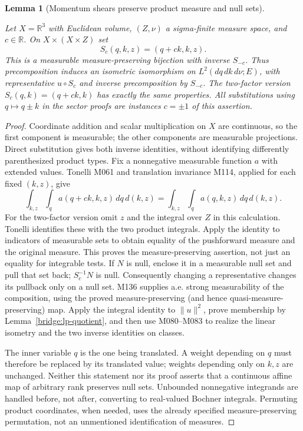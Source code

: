 \documentclass[11pt,a4paper]{article}
\newtheorem{lemma}[theorem]{Lemma}
\theoremstyle{definition}
\theoremstyle{remark}
\newcommand{\proofid}[1]{\par\smallskip{\normalfont\scriptsize\color{inkblue}Stable ID: \nolinkurl{#1}}\par\smallskip}
\begin{document}
\begin{lemma}[Momentum shears preserve product measure and null sets]
\label{bridge:shear}
\proofid{bridge:shear}
\par{}\par\smallskip
Let $X=\mathbb R^3$ with Euclidean volume, $(Z,\nu)$ a sigma-finite
measure space, and $c\in\mathbb R$. On $X\times(X\times Z)$ set
\[
 S_c(q,k,z)=(q+ck,k,z).
\]
This is a measurable measure-preserving bijection with inverse $S_{-c}$.
Thus precomposition induces an isometric isomorphism on
$L^2(dq\,dk\,d\nu;E)$, with representative $u\circ S_c$ and inverse
precomposition by $S_{-c}$. The two-factor version $S_c(q,k)=(q+ck,k)$ has exactly the same
properties. All substitutions using $q\mapsto q\pm k$
in the sector proofs are instances $c=\pm1$ of this assertion.
\end{lemma}
\begin{proof}
Coordinate addition and scalar multiplication on $X$ are continuous,
so the first component is measurable; the other components are
measurable projections. Direct substitution gives both inverse
identities, without identifying differently parenthesized product types.
Fix a nonnegative measurable function $a$ with extended values.
Tonelli M061 and translation invariance M114, applied for each fixed
$(k,z)$, give
\[
 \int_{k,z}\int_q a(q+ck,k,z)\,dq\,d(k,z)
 =\int_{k,z}\int_q a(q,k,z)\,dq\,d(k,z).
\]
For the two-factor version omit $z$ and the integral over $Z$ in
this calculation. Tonelli identifies these with the two product integrals. Apply the
identity to indicators of measurable sets to obtain equality of the
pushforward measure and the original measure. This proves the
measure-preserving assertion, not just an equality for integrable tests.
If $N$ is null, enclose it in a measurable null set and pull that set
back; $S_c^{-1}N$ is null. Consequently changing a representative
changes its pullback only on a null set. M136 supplies a.e. strong
measurability of the composition, using the proved measure-preserving
(and hence quasi-measure-preserving) map. Apply the integral identity
to $\|u\|^2$, prove membership by
Lemma~\ref{bridge:lp-quotient}, and then use M080--M083 to realize the
linear isometry and the two inverse identities on classes.

The inner variable $q$ is the one being translated. A weight depending
on $q$ must therefore be replaced by its translated value; weights
depending only on $k,z$ are unchanged. Neither this statement nor its
proof asserts that a continuous affine map of arbitrary rank preserves
null sets. Unbounded nonnegative integrands are handled before, not
after, converting to real-valued Bochner integrals. Permuting product
coordinates, when needed, uses the already specified measure-preserving
permutation, not an unmentioned identification of measures.
\end{proof}
\end{document}
